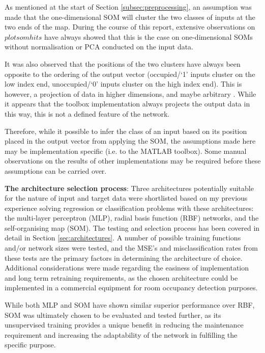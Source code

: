 \documentclass[10pt, oneside]{article}
\begin{document}
As mentioned at the start of Section \ref{subsec:preprocessing}, an assumption was made that the one-dimensional SOM will cluster the two classes of inputs at the two ends of the map. During the course of this report, extensive observations on $plotsomhits$ have always showed that this is the case on one-dimensional SOMs without normalisation or PCA conducted on the input data. 

It was also observed that the positions of the two clusters have always been opposite to the ordering of the output vector (occupied/`1' inputs cluster on the low index end, unoccupied/`0' inputs cluster on the high index end). This is however, a projection of data in higher dimensions, and maybe arbitrary \cite[p. 10]{som-app-lecture}. While it appears that the toolbox implementation always projects the output data in this way, this is not a defined feature of the network.

Therefore, while it possible to infer the class of an input based on its position placed in the output vector from applying the SOM, the assumptions made here may be implementation specific (i.e. to the MATLAB toolbox). Some manual observations on the results of other implementations may be required before these assumptions can be carried over. 

\textbf{The architecture selection process}: Three architectures potentially suitable for the nature of input and target data were shortlisted based on my previous experience solving regression or classification problems with these architectures: the multi-layer perceptron (MLP), radial basis function (RBF) networks, and the self-organising map (SOM). The testing and selection process has been covered in detail in Section \ref{sec:architectures}. A number of possible training functions and/or network sizes were tested, and the MSE's and misclassification rates from these tests are the primary factors in determining the architecture of choice. Additional considerations were made regarding the easiness of implementation and long term retraining requirements, as the chosen architecture could be implemented in a commercial equipment for room occupancy detection purposes. 

While both MLP and SOM have shown similar superior performance over RBF, SOM was ultimately chosen to be evaluated and tested further, as its unsupervised training provides a unique benefit in reducing the maintenance requirement and increasing the adaptability of the network in fulfilling the specific purpose.
\end{document}

